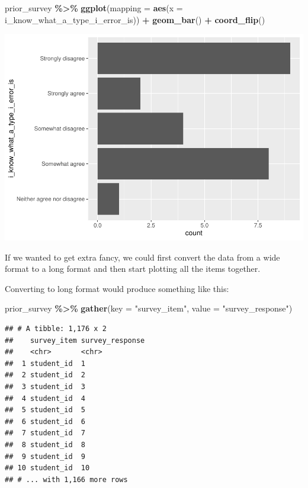 \documentclass[
]{book}
\newenvironment{Shaded}{\begin{snugshade}}{\end{snugshade}}
\newcommand{\DataTypeTok}[1]{\textcolor[rgb]{0.13,0.29,0.53}{#1}}
\newcommand{\KeywordTok}[1]{\textcolor[rgb]{0.13,0.29,0.53}{\textbf{#1}}}
\newcommand{\NormalTok}[1]{#1}
\newcommand{\OperatorTok}[1]{\textcolor[rgb]{0.81,0.36,0.00}{\textbf{#1}}}
\newcommand{\StringTok}[1]{\textcolor[rgb]{0.31,0.60,0.02}{#1}}
\begin{document}
\begin{Shaded}
\begin{Highlighting}[]
\NormalTok{prior\_survey }\OperatorTok{\%\textgreater{}\%}\StringTok{ }
\StringTok{  }\KeywordTok{ggplot}\NormalTok{(}\DataTypeTok{mapping =} \KeywordTok{aes}\NormalTok{(}\DataTypeTok{x =}\NormalTok{ i\_know\_what\_a\_type\_i\_error\_is)) }\OperatorTok{+}
\StringTok{  }\KeywordTok{geom\_bar}\NormalTok{() }\OperatorTok{+}
\StringTok{  }\KeywordTok{coord\_flip}\NormalTok{()}
\end{Highlighting}
\end{Shaded}

\includegraphics{test_course_notes_files/figure-latex/unnamed-chunk-8-1.pdf}

If we wanted to get extra fancy, we could first convert the data from a wide format to a long format and then start plotting all the items together.

Converting to long format would produce something like this:

\begin{Shaded}
\begin{Highlighting}[]
\NormalTok{prior\_survey }\OperatorTok{\%\textgreater{}\%}\StringTok{ }
\StringTok{  }\KeywordTok{gather}\NormalTok{(}\DataTypeTok{key =} \StringTok{"survey\_item"}\NormalTok{, }\DataTypeTok{value =} \StringTok{"survey\_response"}\NormalTok{)}
\end{Highlighting}
\end{Shaded}

\begin{verbatim}
## # A tibble: 1,176 x 2
##    survey_item survey_response
##    <chr>       <chr>          
##  1 student_id  1              
##  2 student_id  2              
##  3 student_id  3              
##  4 student_id  4              
##  5 student_id  5              
##  6 student_id  6              
##  7 student_id  7              
##  8 student_id  8              
##  9 student_id  9              
## 10 student_id  10             
## # ... with 1,166 more rows
\end{verbatim}
\end{document}
